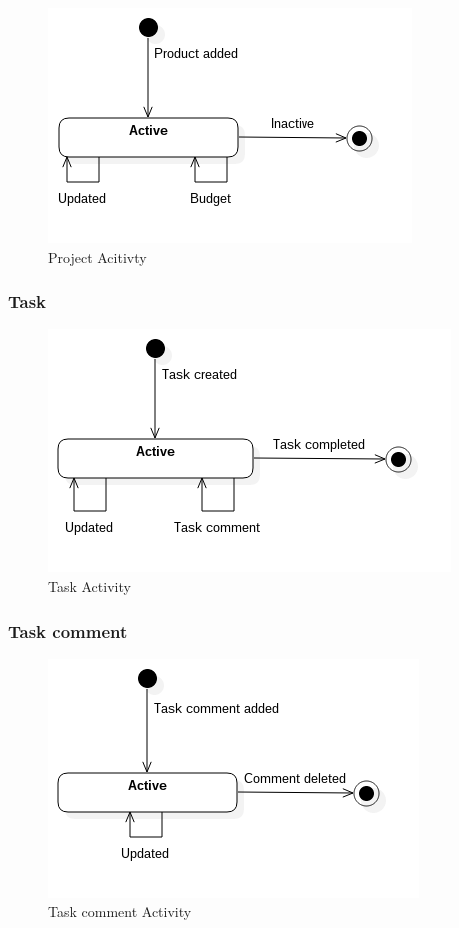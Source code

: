 \begin{figure}[H]
    \centering
    \includegraphics[scale=0.7]{Images/ProblemDomain/productActivityDiagram.png}
    \caption{Project Acitivty}
    \label{fig:productAcitvityDiagram}
\end{figure}

\subsubsection*{Task}

\begin{figure}[H]
    \centering
    \includegraphics[scale=0.7]{Images/ProblemDomain/taskActivityDiagram.png}
    \caption{Task Activity}
    \label{fig:taskActivityDiagram}
\end{figure}

\subsubsection*{Task comment}

\begin{figure}[H]
    \centering
    \includegraphics[scale=0.7]{Images/ProblemDomain/tcActivityDiagram.png}
    \caption{Task comment Activity}
    \label{fig:tcActivityDiagram}
\end{figure}

